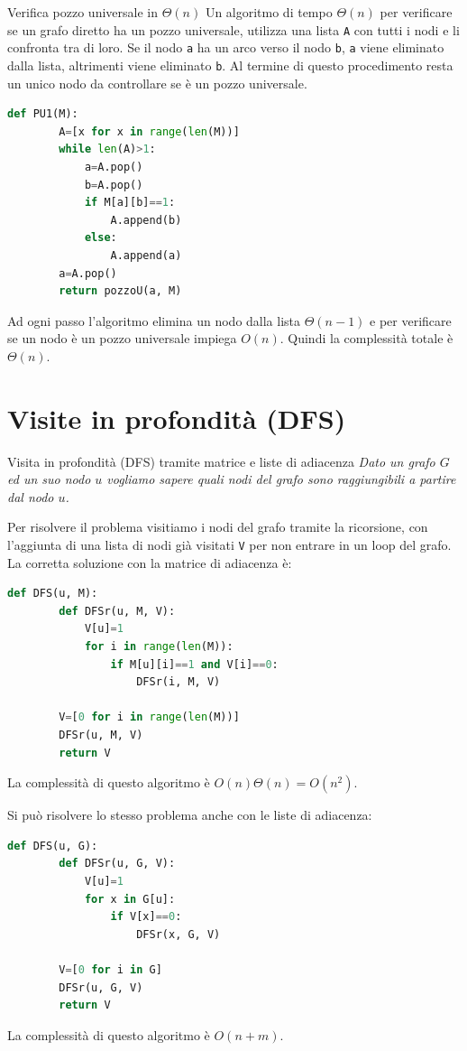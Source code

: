 \begin{Algoritmo}{Verifica pozzo universale in $\Theta(n)$}{}
    Un algoritmo di tempo $\Theta(n)$ per verificare se un grafo diretto ha un pozzo universale, utilizza una lista \verb|A| con tutti i nodi e li confronta tra di loro. Se il nodo \verb|a| ha un arco verso il nodo \verb|b|, \verb|a| viene eliminato dalla lista, altrimenti viene eliminato \verb|b|. Al termine di questo procedimento resta un unico nodo da controllare se è un pozzo universale.

    \begin{lstlisting}[language=Python]
    def PU1(M):
        A=[x for x in range(len(M))]
        while len(A)>1:
            a=A.pop()
            b=A.pop()
            if M[a][b]==1:
                A.append(b)
            else:
                A.append(a)
        a=A.pop()
        return pozzoU(a, M)
    \end{lstlisting}

    Ad ogni passo l'algoritmo elimina un nodo dalla lista $\Theta(n-1)$ e per verificare se un nodo è un pozzo universale impiega $O(n)$. Quindi la complessità totale è $\Theta(n)$.
\end{Algoritmo}


\section{Visite in profondità (DFS)}

\begin{Algoritmo}{Visita in profondità (DFS) tramite matrice e liste di adiacenza}{}
    \textit{Dato un grafo $G$ ed un suo nodo $u$ vogliamo sapere quali nodi del grafo sono raggiungibili a partire dal nodo $u$.}

    Per risolvere il problema visitiamo i nodi del grafo tramite la ricorsione, con l'aggiunta di una lista di nodi già visitati \verb|V| per non entrare in un loop del grafo. La corretta soluzione con la matrice di adiacenza è:

    \begin{lstlisting}[language=Python]
    def DFS(u, M):
        def DFSr(u, M, V):
            V[u]=1
            for i in range(len(M)):
                if M[u][i]==1 and V[i]==0:
                    DFSr(i, M, V)
        
        V=[0 for i in range(len(M))]
        DFSr(u, M, V)
        return V
    \end{lstlisting}

    La complessità di questo algoritmo è $O(n)\Theta(n)=O(n^2)$.

    Si può risolvere lo stesso problema anche con le liste di adiacenza:

    \begin{lstlisting}[language=Python]
    def DFS(u, G):
        def DFSr(u, G, V):
            V[u]=1
            for x in G[u]:
                if V[x]==0:
                    DFSr(x, G, V)
        
        V=[0 for i in G]
        DFSr(u, G, V)
        return V
    \end{lstlisting}

    La complessità di questo algoritmo è $O(n+m)$.
\end{Algoritmo}

